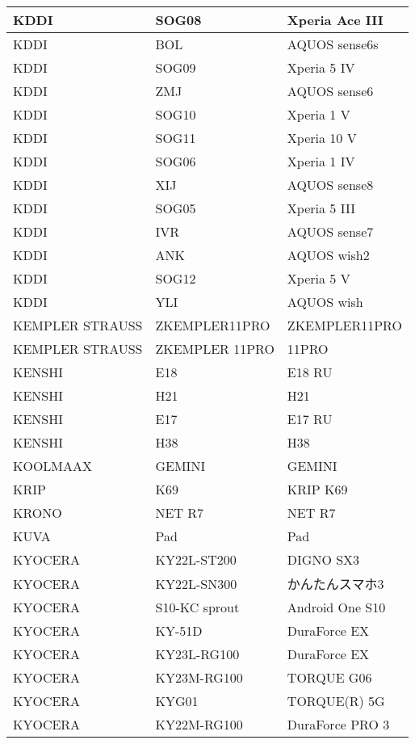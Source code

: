 \begin{tabularx}{\linewidth}{|l|X|X|}
        KDDI & SOG08 & Xperia Ace III \\ \hline
        KDDI & BOL & AQUOS sense6s \\ \hline
        KDDI & SOG09 & Xperia 5 IV \\ \hline
        KDDI & ZMJ & AQUOS sense6 \\ \hline
        KDDI & SOG10 & Xperia 1 V \\ \hline
        KDDI & SOG11 & Xperia 10 V \\ \hline
        KDDI & SOG06 & Xperia 1 IV \\ \hline
        KDDI & XIJ & AQUOS sense8 \\ \hline
        KDDI & SOG05 & Xperia 5 III \\ \hline
        KDDI & IVR & AQUOS sense7 \\ \hline
        KDDI & ANK & AQUOS wish2 \\ \hline
        KDDI & SOG12 & Xperia 5 V \\ \hline
        KDDI & YLI & AQUOS wish \\ \hline
        KEMPLER STRAUSS & ZKEMPLER11PRO & ZKEMPLER11PRO \\ \hline
        KEMPLER STRAUSS & ZKEMPLER 11PRO & 11PRO \\ \hline
        KENSHI & E18 & E18 RU \\ \hline
        KENSHI & H21 & H21 \\ \hline
        KENSHI & E17 & E17 RU \\ \hline
        KENSHI & H38 & H38 \\ \hline
        KOOLMAAX & GEMINI & GEMINI \\ \hline
        KRIP & K69 & KRIP K69 \\ \hline
        KRONO & NET R7 & NET R7 \\ \hline
        KUVA & Pad & Pad \\ \hline
        KYOCERA & KY22L-ST200 & DIGNO SX3 \\ \hline
        KYOCERA & KY22L-SN300 & かんたんスマホ3 \\ \hline
        KYOCERA & S10-KC sprout & Android One S10 \\ \hline
        KYOCERA & KY-51D & DuraForce EX \\ \hline
        KYOCERA & KY23L-RG100 & DuraForce EX \\ \hline
        KYOCERA & KY23M-RG100 & TORQUE G06 \\ \hline
        KYOCERA & KYG01 & TORQUE(R) 5G \\ \hline
        KYOCERA & KY22M-RG100 & DuraForce PRO 3 \\ \hline

\end{tabularx}
